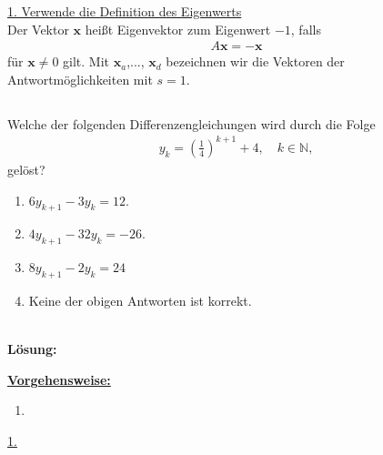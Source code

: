 \underline{1. Verwende die Definition des Eigenwerts}\\
Der Vektor $ \textbf{x} $ heißt Eigenvektor zum Eigenwert $ -1 $, falls
\begin{align*}
	A \textbf{x} = - \textbf{x}
\end{align*}
für $ \textbf{x} \neq 0 $ gilt. Mit $ \textbf{x}_a $,..., $ \textbf{x}_d $ bezeichnen wir die Vektoren der Antwortmöglichkeiten mit $ s = 1 $. 


\newpage

\subsection*{}
Welche der folgenden Differenzengleichungen wird durch die Folge
\begin{align*}
	y_{k} = \left(\frac{1}{4}\right)^{k+1} + 4, \quad k \in \mathbb{N},
\end{align*}
gelöst?
\renewcommand{\labelenumi}{(\alph{enumi})}
\begin{enumerate}
	\item
	$ 6 y_{k+1}  - 3 y_k = 12$.
	\item
	$ 4 y_{k+1} - 32 y_k = -26 $.	
	\item 
	$ 8 y_{k+1} - 2 y_k = 24 $
	\item
	Keine der obigen Antworten ist korrekt.
\end{enumerate}
\ \\
\textbf{Lösung:}
\begin{mdframed}
\underline{\textbf{Vorgehensweise:}}
\renewcommand{\labelenumi}{\theenumi.}
\begin{enumerate}
\item 
\end{enumerate}
\end{mdframed}

\underline{1. }\\

\newpage

